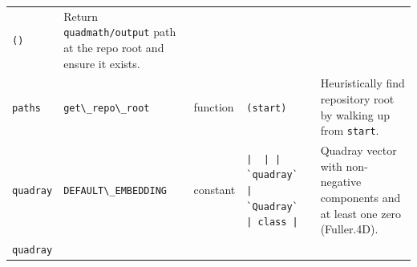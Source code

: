 \documentclass[
  10pt,
]{article}
\newcommand{\passthrough}[1]{#1}
\begin{document}
\begin{longtable}[]{@{}lllll@{}}
\begin{minipage}[t]{0.17\columnwidth}
\passthrough{\lstinline!()!}\strut
\end{minipage} & \begin{minipage}[t]{0.17\columnwidth}\raggedright
Return \passthrough{\lstinline!quadmath/output!} path at the repo root
and ensure it exists.\strut
\end{minipage}\tabularnewline
\begin{minipage}[t]{0.17\columnwidth}\raggedright
\passthrough{\lstinline!paths!}\strut
\end{minipage} & \begin{minipage}[t]{0.17\columnwidth}\raggedright
\passthrough{\lstinline!get\_repo\_root!}\strut
\end{minipage} & \begin{minipage}[t]{0.17\columnwidth}\raggedright
function\strut
\end{minipage} & \begin{minipage}[t]{0.17\columnwidth}\raggedright
\passthrough{\lstinline!(start)!}\strut
\end{minipage} & \begin{minipage}[t]{0.17\columnwidth}\raggedright
Heuristically find repository root by walking up from
\passthrough{\lstinline!start!}.\strut
\end{minipage}\tabularnewline
\begin{minipage}[t]{0.17\columnwidth}\raggedright
\passthrough{\lstinline!quadray!}\strut
\end{minipage} & \begin{minipage}[t]{0.17\columnwidth}\raggedright
\passthrough{\lstinline!DEFAULT\_EMBEDDING!}\strut
\end{minipage} & \begin{minipage}[t]{0.17\columnwidth}\raggedright
constant\strut
\end{minipage} & \begin{minipage}[t]{0.17\columnwidth}\raggedright
\passthrough{\lstinline!|  | | `quadray` | `Quadray` | class |!}\strut
\end{minipage} & \begin{minipage}[t]{0.17\columnwidth}\raggedright
Quadray vector with non-negative components and at least one zero
(Fuller.4D).\strut
\end{minipage}\tabularnewline
\begin{minipage}[t]{0.17\columnwidth}\raggedright
\passthrough{\lstinline!quadray!}\strut
\end{minipage} & \begin{minipage}[t]{0.17\columnwidth}\raggedright

\end{minipage}
\end{longtable}
\end{document}
